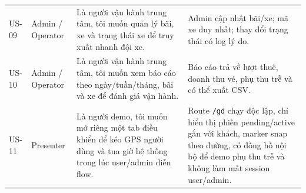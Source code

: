 \begin{longtable}{P{0.10\textwidth}P{0.18\textwidth}P{0.42\textwidth}P{0.20\textwidth}}
US-09 & Admin / Operator & Là người vận hành trung tâm, tôi muốn quản lý bãi, xe và trạng thái xe để truy xuất nhanh đội xe. & Admin cập nhật bãi/xe; mã xe duy nhất; thay đổi trạng thái có log lý do. \\
US-10 & Admin / Operator & Là người vận hành trung tâm, tôi muốn xem báo cáo theo ngày/tuần/tháng, bãi và xe để đánh giá vận hành. & Báo cáo trả về lượt thuê, doanh thu vé, phụ thu trễ và có thể xuất CSV. \\
US-11 & Presenter & Là người demo, tôi muốn mở riêng một tab điều khiển để kéo GPS người dùng và tua giờ hệ thống trong lúc user/admin diễn flow. & Route \texttt{/gd} chạy độc lập, chỉ hiển thị phiên pending/active gắn với khách, marker snap theo đường, có đồng hồ nội bộ để demo phụ thu trễ và không làm mất session user/admin. \\
\bottomrule
\end{longtable}
